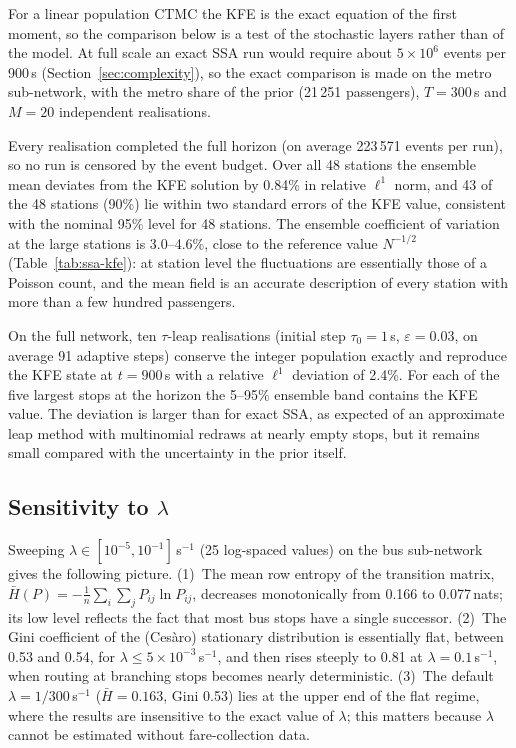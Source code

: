 \documentclass[12pt,a4paper]{article}
\theoremstyle{plain}
\theoremstyle{definition}
\theoremstyle{remark}
\begin{document}
For a linear population CTMC the KFE is the exact equation of the first moment,
so the comparison below is a test of the stochastic layers rather than of the
model.  At full scale an exact SSA run would require about $5\times10^6$
events per 900\,s (Section~\ref{sec:complexity}), so the exact comparison is
made on the metro sub-network, with the metro share of the prior (21\,251
passengers), $T=300$\,s and $M=20$ independent realisations.



Every realisation completed the full horizon (on average 223\,571 events per
run), so no run is censored by the event budget.  Over all 48 stations the
ensemble mean deviates from the KFE solution by 0.84\% in relative $\ell^1$
norm, and 43 of the 48 stations (90\%) lie within two standard errors of the
KFE value, consistent with the nominal 95\% level for 48 stations.  The ensemble
coefficient of variation at the large stations is 3.0--4.6\%, close to the
reference value $N^{-1/2}$ (Table~\ref{tab:ssa-kfe}): at station level the
fluctuations are essentially those of a Poisson count, and the mean field is an
accurate description of every station with more than a few hundred passengers.

On the full network, ten $\tau$-leap realisations (initial step
$\tau_0=1$\,s, $\varepsilon=0.03$, on average 91 adaptive steps) conserve the
integer population exactly and reproduce the KFE state at $t=900$\,s with a
relative $\ell^1$ deviation of 2.4\%.  For each of the five largest stops at the
horizon the 5--95\% ensemble band contains the KFE value.  The deviation is
larger than for exact SSA, as expected of an approximate leap method with
multinomial redraws at nearly empty stops, but it remains small compared with
the uncertainty in the prior itself.

\subsection{Sensitivity to $\lambda$}

Sweeping $\lambda\in[10^{-5},10^{-1}]$\,s$^{-1}$ (25 log-spaced values) on
the bus sub-network gives the following picture.  (1)~The mean row entropy of
the transition matrix, $\bar H(P)=-\frac1n\sum_i\sum_jP_{ij}\ln P_{ij}$,
decreases monotonically from 0.166 to 0.077\,nats; its low level reflects the
fact that most bus stops have a single successor.  (2)~The Gini coefficient of
the (Ces\`aro) stationary distribution is essentially flat, between 0.53 and
0.54, for $\lambda\le5\times10^{-3}$\,s$^{-1}$, and then rises steeply to
0.81 at $\lambda=0.1$\,s$^{-1}$, when routing at branching stops becomes
nearly deterministic.  (3)~The default $\lambda=1/300$\,s$^{-1}$
($\bar H=0.163$, Gini 0.53) lies at the upper end of the flat regime, where the
results are insensitive to the exact value of $\lambda$; this matters because
$\lambda$ cannot be estimated without fare-collection data.
\end{document}
